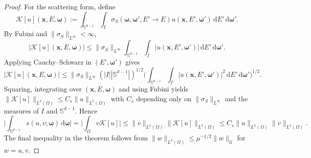 \documentclass[10pt,a4paper]{amsart}
\renewcommand{\d}{\ensuremath{\,\mathrm{d}}}
\newcommand{\qp}[1]{\ensuremath{\!\left({#1}\right)}}
\renewcommand{\vec}[1]{\ensuremath{\boldsymbol{#1}}}
\begin{document}
\begin{proof}
For the scattering form, define
\begin{equation*}
  \mathcal{K}[u]\qp{\vec{x},E,\vec{\omega}}
  :=
  \int_{\mathbb{S}^{d-1}}\int_I
  \sigma_S\qp{\vec{\omega},\vec{\omega}',E'\to E} 
  u\qp{\vec{x},E',\vec{\omega}'} \d E' \d\vec{\omega}'.
\end{equation*}
By Fubini and $\|\sigma_S\|_{L^\infty}<\infty$,
\begin{equation*}
  |\mathcal{K}[u]\qp{\vec{x},E,\vec{\omega}}|
  \le
  \|\sigma_S\|_{L^\infty}\int_{\mathbb{S}^{d-1}}\int_I
  |u\qp{\vec{x},E',\vec{\omega}'}| \d E' \d\vec{\omega}'.
\end{equation*}
Applying Cauchy--Schwarz in $(E',\vec{\omega}')$ gives
\[
  |\mathcal{K}[u]\qp{\vec{x},E,\vec{\omega}}|
  \le
  \|\sigma_S\|_{L^\infty} \qp{|I| |\mathbb S^{d-1}|}^{1/2}
  \Big(\int_{\mathbb{S}^{d-1}}\int_I |u\qp{\vec{x},E',\vec{\omega}'}|^2 \d E' \d\vec{\omega}'\Big)^{1/2}.
\]
Squaring, integrating over $(\vec{x},E,\vec{\omega})$ and using Fubini yields
$\|\mathcal{K}[u]\|_{L^2(\Omega)} \le C_s\|u\|_{L^2(\Omega)}$ with $C_s$ depending only on
$\|\sigma_S\|_{L^\infty}$ and the measures of $I$ and $\mathbb{S}^{d-1}$. Hence
\begin{equation*}
  \Big|\int_{\mathbb{S}^{d-1}} s(u,v;\vec{\omega}) \d\vec{\omega}\Big|
  =
  \Big|\int_\Omega v \mathcal{K}[u]\Big|
  \le
  \|v\|_{L^2(\Omega)}\|\mathcal{K}[u]\|_{L^2(\Omega)}
  \le
  C_s\|u\|_{L^2(\Omega)}\|v\|_{L^2(\Omega)}.
\end{equation*}
The final inequality in the theorem follows from $\|w\|_{L^2(\Omega)}\le \mu^{-1/2}\|w\|_{\mathcal{U}}$ for $w=u,v$.
\end{proof}
\end{document}

